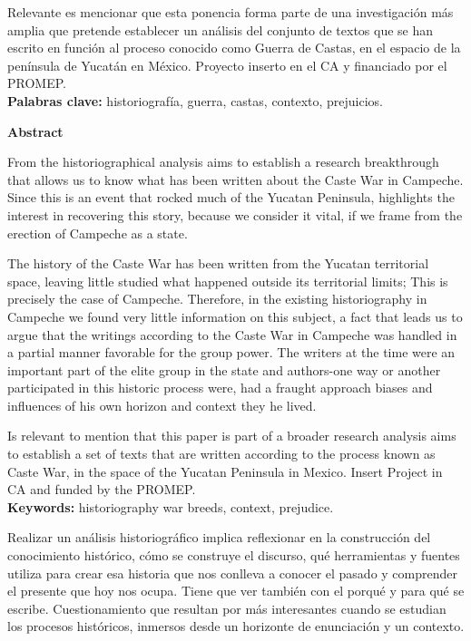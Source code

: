Relevante es mencionar que esta ponencia forma  parte de una investigación
más amplia que pretende establecer un análisis del conjunto de textos que
se han escrito en función al proceso conocido como Guerra de Castas, en el
espacio de la península de Yucatán en México. Proyecto inserto en el CA y
financiado por el PROMEP.\\
\textbf{Palabras clave:} historiografía, guerra, castas, contexto,
prejuicios.


\bigskip
\textbf{Abstract}

\begin{sloppypar}
From the historiographical analysis aims to establish a research
breakthrough that allows us to know what has been written about the Caste
War in Campeche. Since this is an event that rocked much of the Yucatan
Peninsula, highlights the interest in recovering this story, because we
consider it vital, if we frame from the erection of Campeche as a state.
\end{sloppypar}

The history of the Caste War has been written from the Yucatan territorial
space, leaving little studied what happened outside its territorial limits;
This is precisely the case of Campeche. Therefore, in the existing
historiography in Campeche we found very little information on this
subject, a fact that leads us to argue that the writings according to the
Caste War in Campeche was handled in a partial manner favorable for the
group power. The writers at the time were an important part of the elite
group in the state and authors-one way or another participated in this
historic process were, had a fraught approach biases and influences of his
own horizon and context they he lived.

Is relevant to mention that this paper is part of a broader research
analysis aims to establish a set of texts that are written according to the
process known as Caste War, in the space of the Yucatan Peninsula in
Mexico. Insert Project in CA and funded by the PROMEP.\\
\textbf{Keywords:} historiography war breeds, context, prejudice.
\newpage

Realizar un análisis historiográfico  implica reflexionar en la construcción
del conocimiento histórico, cómo se construye el discurso, qué herramientas
y fuentes utiliza para crear esa historia que nos conlleva a conocer el
pasado y comprender el presente que hoy nos ocupa. Tiene que ver también
con el porqué y para qué se escribe. Cuestionamiento que resultan por más
interesantes cuando se estudian los procesos históricos, inmersos desde un
horizonte de enunciación y un contexto.

